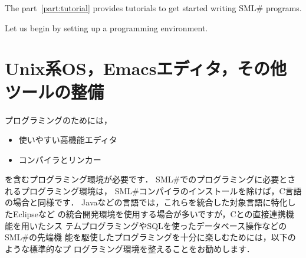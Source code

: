 \documentclass{jbook}
\newif\ifjp
\newcommand{\txt}[2]{#1}
\newcommand{\smlsharp}{SML\#}
\begin{document}
\ifjp%
	第２部では，\smlsharp{}でプログラミングをマスターするための
チュートリアルを提供します．
	まず\smlsharp{}プログラミング環境を整えましょう．
\else%
	The part~\ref{part:tutorial} provides tutorials to get started
writing \smlsharp{} programs.

	Let us begin by setting up a programming environment.
\fi%

\section{
\txt{Unix系OS，Emacsエディタ，その他ツールの整備}
    {Unix-family OS，Emacs，and other tools}}
\label{sec:tutorialEnvironmemt}

\ifjp%
	プログラミングのためには，
\begin{itemize}
\item 使いやすい高機能エディタ
\item コンパイラとリンカー
\end{itemize}
を含むプログラミング環境が必要です．
	\smlsharp{}でのプログラミングに必要とされるプログラミング環境は，
\smlsharp{}コンパイラのインストールを除けば，C言語の場合と同様です．
	Javaなどの言語では，これらを統合した対象言語に特化したEclipseなど
の統合開発環境を使用する場合が多いですが，Cとの直接連携機能を用いたシス
テムプログラミングやSQLを使ったデータベース操作などの\smlsharp{}の先端機
能を駆使したプログラミングを十分に楽しむためには，以下のような標準的なプ
ログラミング環境を整えることをお勧めします．
\end{document}
